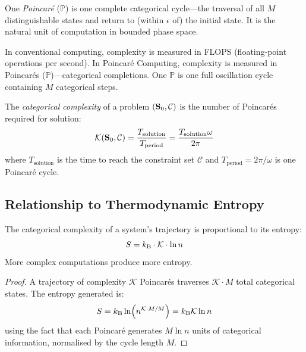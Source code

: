 \begin{definition}
\label{def:poincare_unit}
One \emph{Poincar\'{e}} ($\mathbb{P}$) is one complete categorical cycle---the traversal of all $M$ distinguishable states and return to (within $\epsilon$ of) the initial state. It is the natural unit of computation in bounded phase space.
\end{definition}

\begin{remark}
In conventional computing, complexity is measured in FLOPS (floating-point operations per second). In Poincar\'{e} Computing, complexity is measured in Poincar\'{e}s ($\mathbb{P}$)---categorical completions. One $\mathbb{P}$ is one full oscillation cycle containing $M$ categorical steps.
\end{remark}

\begin{definition}
\label{def:complexity}
The \emph{categorical complexity} of a problem $(\mathbf{S}_0, \mathcal{C})$ is the number of Poincar\'{e}s required for solution:
\begin{equation}
    \mathcal{K}(\mathbf{S}_0, \mathcal{C}) = \frac{T_{\mathrm{solution}}}{T_{\mathrm{period}}} = \frac{T_{\mathrm{solution}} \omega}{2\pi}
\end{equation}
where $T_{\mathrm{solution}}$ is the time to reach the constraint set $\mathcal{C}$ and $T_{\mathrm{period}} = 2\pi/\omega$ is one Poincar\'{e} cycle.
\end{definition}

\subsection{Relationship to Thermodynamic Entropy}

\begin{theorem}
\label{thm:complexity_entropy}
The categorical complexity of a system's trajectory is proportional to its entropy:
\begin{equation}
    S = k_{\mathrm{B}} \cdot \mathcal{K} \cdot \ln n
\end{equation}
More complex computations produce more entropy.
\end{theorem}

\begin{proof}
A trajectory of complexity $\mathcal{K}$ Poincar\'{e}s traverses $\mathcal{K} \cdot M$ total categorical states. The entropy generated is:
\begin{equation}
    S = k_{\mathrm{B}} \ln(n^{\mathcal{K} \cdot M/M}) = k_{\mathrm{B}} \mathcal{K} \ln n
\end{equation}
using the fact that each Poincar\'{e} generates $M \ln n$ units of categorical information, normalised by the cycle length $M$.
\end{proof}

